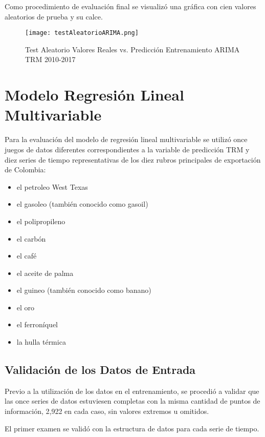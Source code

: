 Como procedimiento de evaluación final se visualizó una gráfica con cien valores aleatorios de prueba y su calce.
\begin{figure}[H]
    \centering
    \texttt{[image: testAleatorioARIMA.png]}
    \caption{Test Aleatorio Valores Reales vs. Predicción Entrenamiento ARIMA TRM 2010-2017}
\end{figure}

\section{Modelo Regresión Lineal Multivariable}
Para la evaluación del modelo de regresión lineal multivariable se utilizó once juegos de datos diferentes correspondientes a la variable de predicción TRM y diez series de tiempo representativas de los diez rubros principales de exportación de Colombia:

\begin{itemize}
  \item el petroleo West Texas
  \item el gasoleo (también conocido como gasoil)
  \item el polipropileno
  \item el carbón
  \item el café
  \item el aceite de palma
  \item el guineo (también conocido como banano)
  \item el oro
  \item el ferroníquel
  \item la hulla térmica
\end{itemize}

\subsection{Validación de los Datos de Entrada}
Previo a la utilización de los datos en el entrenamiento, se procedió a validar que las once series de datos estuviesen completas con la misma cantidad de puntos de información, 2,922 en cada caso, sin valores extremos u omitidos.

El primer examen se validó con la estructura de datos para cada serie de tiempo.


